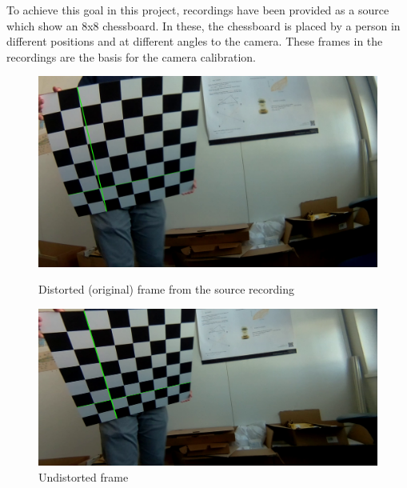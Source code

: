 To achieve this goal in this project, recordings have been provided as a source which show an 8x8 chessboard. In these, the chessboard is placed by a person in different positions and at different angles to the camera. These frames in the recordings are the basis for the camera calibration.\\
\vspace{-2mm}
\begin{figure}
    \centering
     \captionsetup{justification=centering}
     \vspace{-4mm}
     \begin{minipage}[b]{0.55\textwidth}
         \centering
         \includegraphics[width=\textwidth]{image/1/og.png}
         \caption{Distorted (original) frame from the source recording}
         \label{fig:og_frame}\par
         \vspace{6mm}
         \includegraphics[width=\textwidth]{image/1/undist.png}
         \caption{Undistorted frame}
         \label{fig:dst_frame}
     \end{minipage}
     \hfill
     \vspace{-9mm}
\end{figure}

